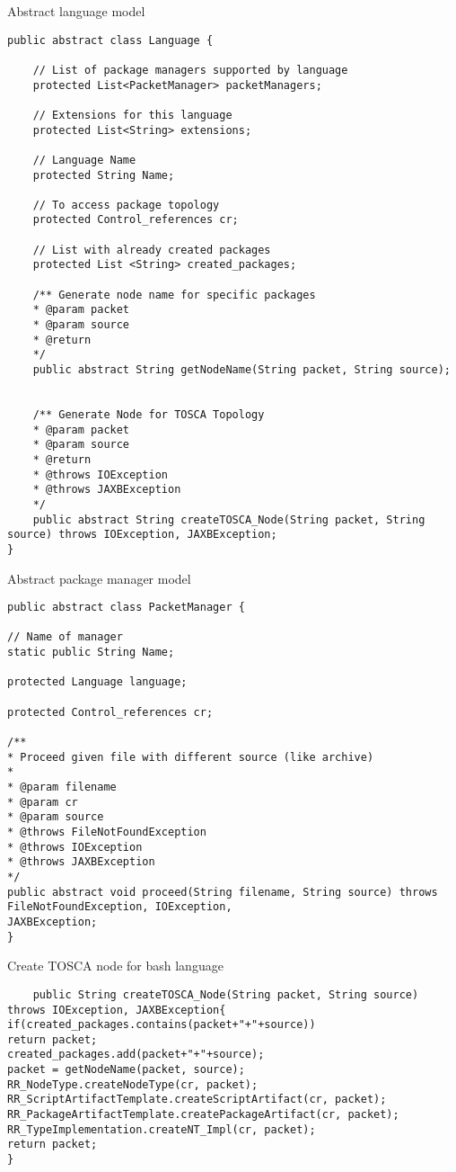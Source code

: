\begin{Listing}
\caption{Abstract language model}
\label{lst:langabst}
\begin{lstlisting}
public abstract class Language {
	
	// List of package managers supported by language
	protected List<PacketManager> packetManagers;
	
	// Extensions for this language
	protected List<String> extensions;
	
	// Language Name
	protected String Name;
	
	// To access package topology
	protected Control_references cr;
	
	// List with already created packages
	protected List <String> created_packages;

	/**	Generate node name for specific packages
	* @param packet
	* @param source
	* @return
	*/
	public abstract String getNodeName(String packet, String source);
	
	
	/**	Generate Node for TOSCA Topology
	* @param packet
	* @param source
	* @return
	* @throws IOException
	* @throws JAXBException
	*/
	public abstract String createTOSCA_Node(String packet, String source) throws IOException, JAXBException;
}
\end{lstlisting}
\end{Listing}

\begin{Listing}
\caption{Abstract package manager model}
\label{lst:pmabst}
\begin{lstlisting}
public abstract class PacketManager {

// Name of manager
static public String Name;

protected Language language;

protected Control_references cr;

/**
* Proceed given file with different source (like archive)
* 
* @param filename
* @param cr
* @param source
* @throws FileNotFoundException
* @throws IOException
* @throws JAXBException
*/
public abstract void proceed(String filename, String source) throws FileNotFoundException, IOException,
JAXBException;
}
\end{lstlisting}
\end{Listing}

\begin{Listing}
\caption{Create TOSCA node for bash language}
\label{lst:create_bash}
\begin{lstlisting}
	public String createTOSCA_Node(String packet, String source) throws IOException, JAXBException{
if(created_packages.contains(packet+"+"+source))
return packet;
created_packages.add(packet+"+"+source);
packet = getNodeName(packet, source);
RR_NodeType.createNodeType(cr, packet);
RR_ScriptArtifactTemplate.createScriptArtifact(cr, packet);
RR_PackageArtifactTemplate.createPackageArtifact(cr, packet);
RR_TypeImplementation.createNT_Impl(cr, packet);
return packet;
}
\end{lstlisting}
\end{Listing}

